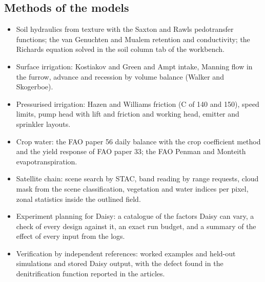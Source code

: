 \subsection{Methods of the models}
\begin{itemize}[nosep,leftmargin=1.2em]
\item Soil hydraulics from texture with the Saxton and Rawls pedotransfer functions; the van Genuchten and Mualem retention and conductivity; the Richards equation solved in the soil column tab of the workbench.
\item Surface irrigation: Kostiakov and Green and Ampt intake, Manning flow in the furrow, advance and recession by volume balance (Walker and Skogerboe).
\item Pressurised irrigation: Hazen and Williams friction (C of 140 and 150), speed limits, pump head with lift and friction and working head, emitter and sprinkler layouts.
\item Crop water: the FAO paper 56 daily balance with the crop coefficient method and the yield response of FAO paper 33; the FAO Penman and Monteith evapotranspiration.
\item Satellite chain: scene search by STAC, band reading by range requests, cloud mask from the scene classification, vegetation and water indices per pixel, zonal statistics inside the outlined field.
\item Experiment planning for Daisy: a catalogue of the factors Daisy can vary, a check of every design against it, an exact run budget, and a summary of the effect of every input from the logs.
\item Verification by independent references: worked examples and held-out simulations and stored Daisy output, with the defect found in the denitrification function reported in the articles.
\end{itemize}

